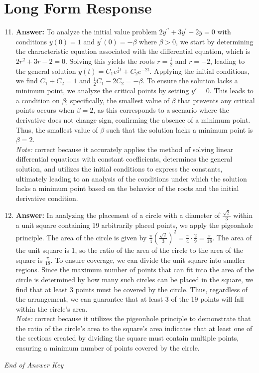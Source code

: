 \documentclass[12pt]{article}
\begin{document}
\section*{Long Form Response}
\begin{enumerate}[label=\arabic*.]
\setcounter{enumi}{10}
\item \textbf{Answer:} To analyze the initial value problem \( 2 y^{\prime \prime} + 3 y^{\prime} - 2 y = 0 \) with conditions \( y(0) = 1 \) and \( y^{\prime}(0) = -\beta \) where \( \beta > 0 \), we start by determining the characteristic equation associated with the differential equation, which is \( 2 r^2 + 3 r - 2 = 0 \). Solving this yields the roots \( r = \frac{1}{2} \) and \( r = -2 \), leading to the general solution \( y(t) = C_1 e^{\frac{1}{2}t} + C_2 e^{-2 t} \). Applying the initial conditions, we find \( C_1 + C_2 = 1 \) and \( \frac{1}{2}C_1 - 2 C_2 = -\beta \). To ensure the solution lacks a minimum point, we analyze the critical points by setting \( y' = 0 \). This leads to a condition on \( \beta \); specifically, the smallest value of \( \beta \) that prevents any critical points occurs when \( \beta = 2 \), as this corresponds to a scenario where the derivative does not change sign, confirming the absence of a minimum point. Thus, the smallest value of \( \beta \) such that the solution lacks a minimum point is \( \beta = 2 \).
\\ \textit{Note:} correct because it accurately applies the method of solving linear differential equations with constant coefficients, determines the general solution, and utilizes the initial conditions to express the constants, ultimately leading to an analysis of the conditions under which the solution lacks a minimum point based on the behavior of the roots and the initial derivative condition.
\item \textbf{Answer:} In analyzing the placement of a circle with a diameter of \(\frac{\sqrt{2}}{3}\) within a unit square containing 19 arbitrarily placed points, we apply the pigeonhole principle. The area of the circle is given by \(\frac{\pi}{4} \left(\frac{\sqrt{2}}{3}\right)^2 = \frac{\pi}{4} \cdot \frac{2}{9} = \frac{\pi}{18}\). The area of the unit square is 1, so the ratio of the area of the circle to the area of the square is \(\frac{\pi}{18}\). To ensure coverage, we can divide the unit square into smaller regions. Since the maximum number of points that can fit into the area of the circle is determined by how many such circles can be placed in the square, we find that at least 3 points must be covered by the circle. Thus, regardless of the arrangement, we can guarantee that at least 3 of the 19 points will fall within the circle's area.
\\ \textit{Note:} correct because it utilizes the pigeonhole principle to demonstrate that the ratio of the circle's area to the square's area indicates that at least one of the sections created by dividing the square must contain multiple points, ensuring a minimum number of points covered by the circle.
\end{enumerate}

\vfill
\noindent\textit{End of Answer Key}
\end{document}
